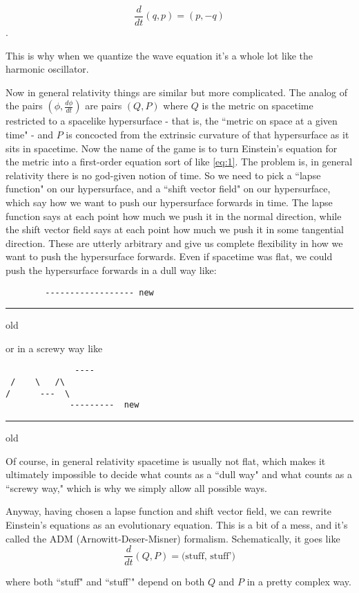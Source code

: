 \[\frac{d}{dt} (q,p) = (p, -q)\].  

This is why when we quantize the wave equation it's a whole lot like the harmonic oscillator.

Now in general relativity things are similar but more complicated. The analog of the pairs $(\phi, \frac{d\phi}{dt})$ are pairs $(Q,P)$ where $Q$ is the metric on spacetime restricted to a spacelike hypersurface - that is, the ``metric on space at a given time" - and $P$ is concocted from the extrinsic curvature of that hypersurface as it sits in spacetime. Now the name of the game is to turn Einstein's equation for the metric into a first-order equation sort of like \ref{eq:1}. The problem is, in general relativity there is no god-given notion of time. So we need to pick a ``lapse function" on our hypersurface, and a ``shift vector field" on our hypersurface, which say how we want to push our hypersurface forwards in time. The lapse function says at each point how much we push it in the normal direction, while the shift vector field says at each point how much we push it in some tangential direction. These are utterly arbitrary and give us complete flexibility in how we want to push the hypersurface forwards. Even if spacetime was flat, we could push the hypersurface forwards in a dull way like:
\begin{verbatim}
        ------------------ new
\end{verbatim}

\quad \quad \quad  \noindent\rule{4cm}{0.4pt} old

or in a screwy way like
\begin{verbatim}
			  ----
 /    \   /\
/      ---  \
             ---------  new
\end{verbatim}
\noindent\rule{5cm}{0.4pt}  old


Of course, in general relativity spacetime is usually not flat, which makes it ultimately impossible to decide what counts as a ``dull way" and what counts as a ``screwy way," which is why we simply allow all possible ways.

Anyway, having chosen a lapse function and shift vector field, we can rewrite Einstein's equations as an evolutionary equation. This is a bit of a mess, and it's called the ADM (Arnowitt-Deser-Misner) formalism. Schematically, it goes like
\begin{equation}
\tag{2}\label{eq:2}
\frac{d}{dt}(Q,P) = \text{(stuff, stuff')}
\end{equation}

where both ``stuff" and ``stuff'" depend on both $Q$ and $P$ in a pretty complex way.


